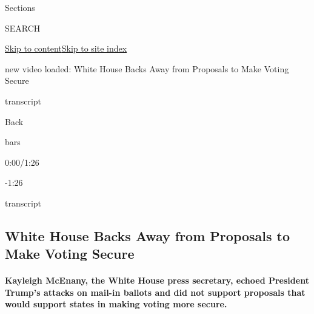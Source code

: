Sections

SEARCH

\protect\hyperlink{site-content}{Skip to
content}\protect\hyperlink{site-index}{Skip to site index}

new video loaded: White House Backs Away from Proposals to Make Voting
Secure

transcript

Back

bars

0:00/1:26

-1:26

transcript

\hypertarget{white-house-backs-away-from-proposals-to-make-voting-secure}{%
\subsection{White House Backs Away from Proposals to Make Voting
Secure}\label{white-house-backs-away-from-proposals-to-make-voting-secure}}

\hypertarget{kayleigh-mcenany-the-white-house-press-secretary-echoed-president-trumps-attacks-on-mail-in-ballots-and-did-not-support-proposals-that-would-support-states-in-making-voting-more-secure}{%
\paragraph{Kayleigh McEnany, the White House press secretary, echoed
President Trump's attacks on mail-in ballots and did not support
proposals that would support states in making voting more
secure.}\label{kayleigh-mcenany-the-white-house-press-secretary-echoed-president-trumps-attacks-on-mail-in-ballots-and-did-not-support-proposals-that-would-support-states-in-making-voting-more-secure}}

